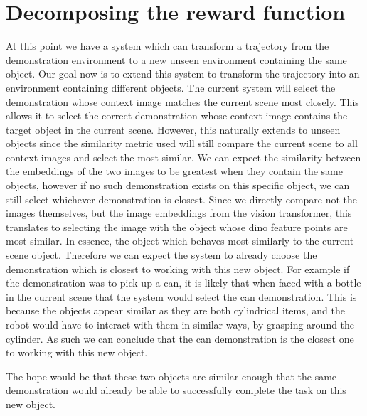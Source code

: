 \section{Decomposing the reward function}
\label{sec:reward-function}
At this point we have a system which can transform a trajectory from the demonstration environment to a new unseen environment containing the same object. Our goal now is to extend this system to transform the trajectory into an environment containing different objects. The current system will select the demonstration whose context image matches the current scene most closely. This allows it to select the correct demonstration whose context image contains the target object in the current scene. However, this naturally extends to unseen objects since the similarity metric used will still compare the current scene to all context images and select the most similar. We can expect the similarity between the embeddings of the two images to be greatest when they contain the same objects, however if no such demonstration exists on this specific object, we can still select whichever demonstration is closest. Since we directly compare not the images themselves, but the image embeddings from the vision transformer, this translates to selecting the image with the object whose dino feature points are most similar. In essence, the object which behaves most similarly to the current scene object. Therefore we can expect the system to already choose the demonstration which is closest to working with this new object. For example if the demonstration was to pick up a can, it is likely that when faced with a bottle in the current scene that the system would select the can demonstration. This is because the objects appear similar as they are both cylindrical items, and the robot would have to interact with them in similar ways, by grasping around the cylinder. As such we can conclude that the can demonstration is the closest one to working with this new object.

The hope would be that these two objects are similar enough that the same demonstration would already be able to successfully complete the task on this new object.



